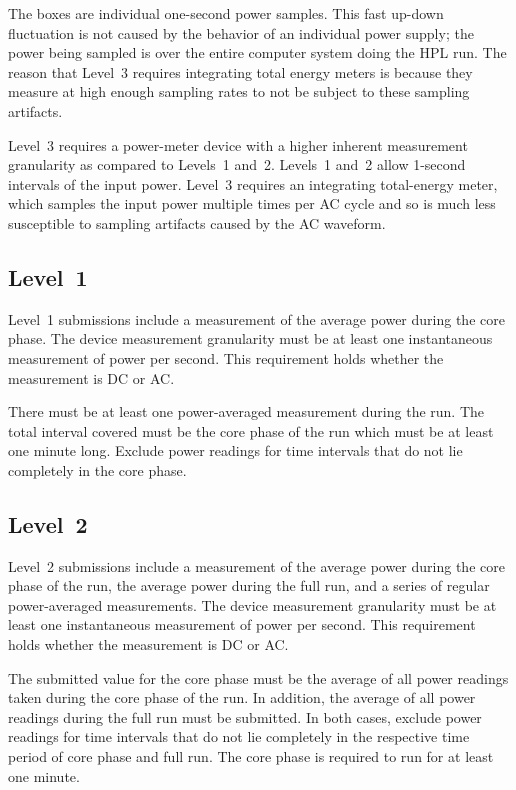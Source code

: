 The boxes are individual one-second power samples.
This fast up-down fluctuation is not caused by the behavior of an individual power supply; the power being sampled is over the entire computer system doing the \acs{HPL} run.
The reason that Level~3 requires integrating total energy meters is because they measure at high enough sampling rates to not be subject to these sampling artifacts.

Level~3 requires a power-meter device with a higher inherent measurement granularity as compared to Levels~1 and~2.
Levels~1 and~2 allow 1-second intervals of the input power.
Level~3 requires an integrating total-energy meter, which samples the input power multiple times per AC cycle and so is much less susceptible to sampling artifacts caused by the AC waveform.

\subsection{Level~1}

Level~1 submissions include a measurement of the average power during the core phase.
The device measurement granularity must be at least one instantaneous measurement of power per second.
This requirement holds whether the measurement is DC or AC.

There must be at least one power-averaged measurement during the run.
The total interval covered must be the core phase of the run which must be at least one minute long.
Exclude power readings for time intervals that do not lie completely in the core phase.

\subsection{Level~2}

Level~2 submissions include a measurement of the average power during the core phase of the run, the average power during the full run, and a series of regular power-averaged measurements.
The device measurement granularity must be at least one instantaneous measurement of power per second.
This requirement holds whether the measurement is DC or AC.

The submitted value for the core phase must be the average of all power readings taken during the core phase of the run.
In addition, the average of all power readings during the full run must be submitted.
In both cases, exclude power readings for time intervals that do not lie completely in the respective time period of core phase and full run.
The core phase is required to run for at least one minute.

